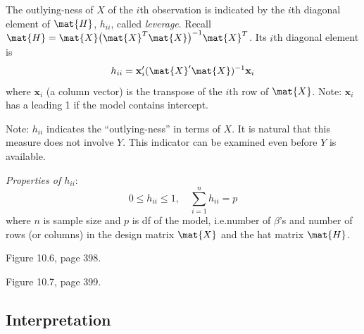 \documentclass[12pt]{article}
\renewcommand\vec[1]{\ensuremath{\mathbf{#1}}}
\begin{document}
The outlying-ness of $X$ of the $i$th observation
is indicated by
the $i$th diagonal element of $\mat{H}$, $h_{ii}$,
called \emph{leverage}.
Recall $\mat{H} = \mat{X}\bigl(\mat{X}^T\mat{X}\bigr)^{-1}\mat{X}^T$.
Its $i$th diagonal element is
\[
h_{ii} = \vec{x}_i' (\mat{X}'\mat{X})^{-1} \vec{x}_i
\]
where $\vec{x}_i$ (a column vector)
is the transpose of the $i$th row of $\mat{X}$.
Note: $\vec{x}_i$ has a leading 1 if the model contains intercept.

Note: $h_{ii}$ indicates the ``outlying-ness'' in terms of $X$.
It is natural that this measure does not involve $Y$.
This indicator can be examined even before $Y$ is available.


\emph{Properties of $h_{ii}$}:
\[
0 \le h_{ii} \le 1,\quad
\sum_{i=1}^n h_{ii} = p
\]
where
$n$ is sample size and
$p$ is df of the model, i.e.\@ number of $\beta$'s and
number of rows (or columns) in the design matrix $\mat{X}$
and the hat matrix $\mat{H}$.

\example
Figure 10.6, page 398.

\example
Figure 10.7, page 399.

\subsection{Interpretation}
\end{document}

